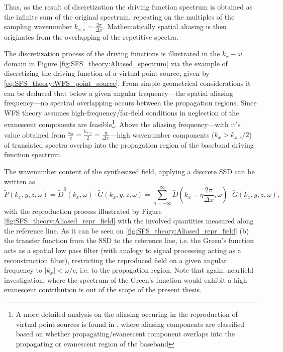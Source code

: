 Thus, as the result of discretization the driving function spectrum is obtained as the infinite sum of the original spectrum, repeating on the multiples of the sampling wavenumber $k_{x,s} = \frac{2\pi}{\Delta x}$.
Mathematically spatial aliasing is then originates from the overlapping of the repetitive spectra.

The discretization process of the driving functions is illustrated in the $k_x-\omega$ domain in Figure \ref{fig:SFS_theory:Aliased_spectrum} via the example of discretizing the driving function of a virtual point source, given by \eqref{eq:SFS_theory:WFS_point_source}.
From simple geometrical considerations it can be deduced that below a given angular frequency---the spatial aliasing frequency---no spectral overlapping occurs between the propagation regions.
Since WFS theory assumes high-frequency/far-field conditions in neglection of the evanescent components are feasible\footnote{A more detailed analysis on the aliasing occuring in the reproduction of virtual point sources is found in \cite{spors2009spatial}, where aliasing components are classified based on whether propagating/evanescent component overlaps into the propagating or evanescent region of the baseband}. 
Above the aliasing frequency---with it's value obtained from $\frac{\omega_a }{c} = \frac{k_{x,s}}{2}= \frac{\pi}{\Delta x}$---high wavenumber components ($k_x>k_{x,s}/2$) of translated spectra overlap into the propagation region of the baseband driving function spectrum.

The wavenumber content of the synthesized field, applying a discrete SSD can be written as
\begin{equation}
\tilde{P}(k_x,y,z, \omega) = \tilde{D}^{\mathrm{S}}(k_x,\omega) \cdot \tilde{G}(k_x,y,z, \omega) = 
\sum_{\eta = -\infty}^{\infty} \tilde{D}\left(k_x - \eta \frac{2\pi}{\Delta x},\omega \right)  \cdot \tilde{G}(k_x,y,z, \omega),
\label{Eq:SFS_theory:Aliased_field_sp}
\end{equation}
with the reproduction process illustrated by Figure \ref{fig:SFS_theory:Aliased_repr_field} with the involved quantities measured along the reference line.
As it can be seen on \ref{fig:SFS_theory:Aliased_repr_field} (b) the transfer function from the SSD to the reference line, i.e. the Green's function acts as a spatial low pass filter (with analogy to signal processing acting as a reconstruction filter), restricting the reproduced field on a given angular frequency to $|k_x| < \omega/c$, i.e. to the propagation region.
Note that again, nearfield investigation, where the spectrum of the Green's function would exhibit a high evanescent contribution is out of the scope of the present thesis.


